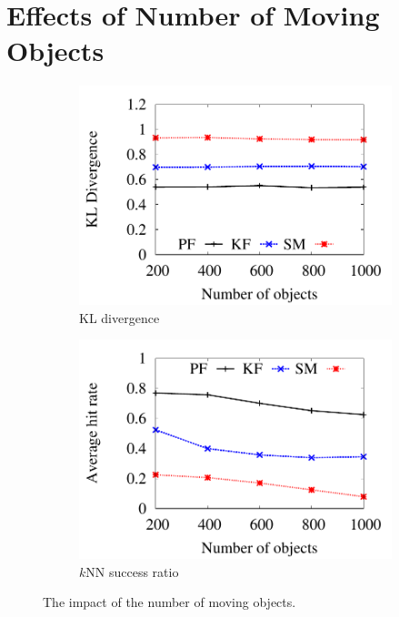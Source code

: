 \documentclass[12pt]{report}
\begin{document}
\section{Effects of Number of Moving Objects}
\label{sec:org75c6c55}


\begin{figure}[h]
  \centering
  \begin{subfigure}{.5\linewidth}
    \centering
    \includegraphics[width=\textwidth]{img/kl-n.pdf}
    \caption{KL divergence}
  \end{subfigure}%
  \begin{subfigure}{.5\linewidth}
    \centering
    \includegraphics[width=\textwidth]{img/hit-n.pdf}
    \caption{\(k\)NN success ratio}
  \end{subfigure}
  \caption{The impact of the number of moving objects.}
  \vspace*{-5pt}
  \label{fig:number-of-objects}
\end{figure}
\end{document}
